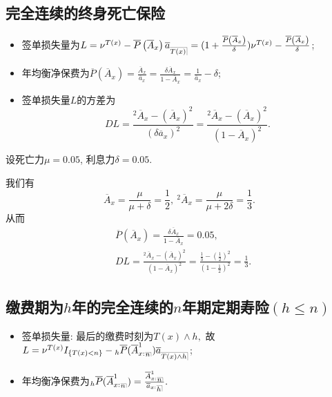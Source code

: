 \documentclass[lang=cn,10pt]{elegantbook}
\makeatletter
\DeclareRobustCommand{\annu}[1]{_{%
    \def\arraystretch{0}%
    \setlength\arraycolsep{1pt}%
    \setlength\arrayrulewidth{.2pt}%
    \begin{array}[b]{@{}c|}\hline
        \\[\arraycolsep]%
        \scriptstyle #1%
    \end{array}%
}}
\makeatother
\begin{document}
\subsection{完全连续的终身死亡保险}
\begin{proposition}
    \begin{itemize}
        \item 签单损失量为$L=\nu^{T(x)}-\overline{P}\left( \overline{A}_x \right)\overline a_{\annu {T(x)}}=(1+\frac{\overline{P}\left( \overline{A}_x \right)}{\delta})\nu^{T(x)}-\frac{\overline{P}\left( \overline{A}_x \right)}{\delta}$;
        \item 年均衡净保费为$\overline{P}\left( \overline{A}_x \right)=\frac{\overline A_x}{\overline a_x}=\frac{\delta\overline A_x}{1-\overline A_x}=\frac{1}{\overline a_x}-\delta$;
        \item 签单损失量$L$的方差为
              $$DL=\frac{^2\overline A_x-(\overline A_x)^2}{(\delta\overline a_x)^2}=\frac{^2\overline A_x-(\overline A_x)^2}{(1-\overline A_x)^2}.$$
    \end{itemize}
\end{proposition}

\begin{example}
    设死亡力$\mu=0.05$, 利息力$\delta=0.05.$
\end{example}
\begin{solution}
    我们有
    $$\overline A_x=\frac{\mu}{\mu+\delta}=\frac{1}{2},\ {}^2\overline A_x=\frac{\mu}{\mu+2\delta}=\frac{1}{3}.$$
    从而
    \begin{align*}
         & \overline{P}\left( \overline{A}_x \right)=\frac{\delta\overline A_x}{1-\overline A_x}=0.05,                                         \\
         & DL=\frac{^2\overline A_x-(\overline A_x)^2}{(1-\overline A_x)^2}=\frac{\frac{1}{3}-(\frac{1}{2})^2}{(1-\frac{1}{2})^2}=\frac{1}{3}.
    \end{align*}

\end{solution}

\subsection{缴费期为$h$年的完全连续的$n$年期定期寿险$(h\le n)$}
\begin{proposition}
    \begin{itemize}
        \item 签单损失量: 最后的缴费时刻为$T(x)\land h,$ 故$L=\nu^{T(x)}I_{\{T(x)<n\}}-{}_{h}\overline{P}(\overline{A}^{1}_{x:}{}_{\annu n})\overline{a}_{\annu{T(x)\land h}}$;
        \item 年均衡净保费为${}_{h}\overline{P}(\overline{A}^{1}_{x:}{}_{\annu n})=\frac{\overline{A}^{1}_{x:}{}_{\annu n}}{\overline{a}_{x:}{}{\annu{h}}}.$
    \end{itemize}
\end{proposition}
\end{document}
